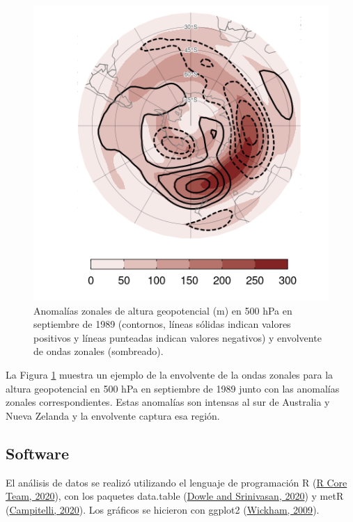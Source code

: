 \documentclass[12pt,oneside,a4paper]{reedthesis}
\begin{document}
\begin{figure}

{\centering \includegraphics{figures/15-onda3/envolvente-ejemplo-1} 

}

\caption{Anomalías zonales de altura geopotencial (m) en 500 hPa en septiembre de 1989 (contornos, líneas sólidas indican valores positivos y líneas punteadas indican valores negativos) y envolvente de ondas zonales (sombreado).}\label{fig:envolvente-ejemplo}
\end{figure}



La Figura \ref{fig:envolvente-ejemplo} muestra un ejemplo de la envolvente de la ondas zonales para la altura geopotencial en 500 hPa en septiembre de 1989 junto con las anomalías zonales correspondientes.
Estas anomalías son intensas al sur de Australia y Nueva Zelanda y la envolvente captura esa región.

\hypertarget{software}{%
\subsection{Software}\label{software}}

El análisis de datos se realizó utilizando el lenguaje de programación R (\protect\hyperlink{ref-rcoreteam2020}{R Core Team, 2020}), con los paquetes data.table (\protect\hyperlink{ref-dowle2020}{Dowle and Srinivasan, 2020}) y metR (\protect\hyperlink{ref-campitelli2020}{Campitelli, 2020}).
Los gráficos se hicieron con ggplot2 (\protect\hyperlink{ref-wickham2009}{Wickham, 2009}).
\end{document}
